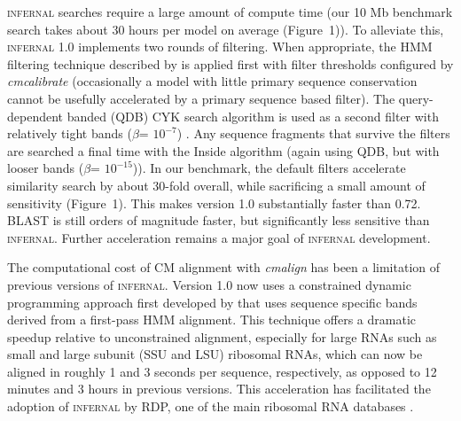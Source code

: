 \textsc{infernal} searches require a large amount of compute time
(our 10 Mb benchmark search takes about 30 hours per
model on average (Figure~1)). To alleviate this, \textsc{infernal} 1.0 implements
two rounds of filtering.  When appropriate, the HMM filtering technique
described by \citet{WeinbergRuzzo06} is applied
first with filter thresholds configured by \emph{cmcalibrate}
(occasionally a model with little primary sequence conservation cannot
be usefully accelerated by a primary sequence based filter).  The
query-dependent banded (QDB) CYK search algorithm is used as a second
filter with relatively tight bands ($\beta$= $10^{-7}$)
\citep{NawrockiEddy07}.  Any sequence fragments that survive the filters are
searched a final time with the Inside algorithm (again using QDB, but with looser
bands ($\beta$= $10^{-15}$)).
In our benchmark, the default filters accelerate similarity search by
about 30-fold overall, while sacrificing a small amount of sensitivity
(Figure~1). This makes version 1.0 substantially faster than
0.72. \textsc{BLAST} is still orders of magnitude faster, but
significantly less sensitive than \textsc{infernal}. Further
acceleration remains a major goal of \textsc{infernal} development.

The computational cost of CM alignment with \emph{cmalign} 
has been a limitation of previous versions of
\textsc{infernal}. Version 1.0 now uses a constrained dynamic
programming approach first developed by \citet{Brown00}
that uses sequence specific bands derived from a first-pass HMM
alignment. This technique offers a dramatic speedup relative to
unconstrained alignment, especially for large RNAs such as small and
large subunit (SSU and LSU) ribosomal RNAs, which can now be aligned
in roughly 1 and 3 seconds per sequence, respectively, as
opposed to 12 minutes and 3 hours in previous versions.
This acceleration has facilitated the adoption of \textsc{infernal}
by RDP, one of the main ribosomal RNA databases \citep{Cole09}.


